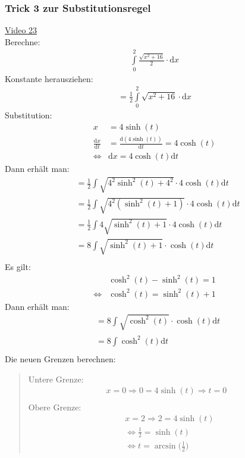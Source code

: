 \subsubsection{Trick 3 zur Substitutionsregel}
\href{https://youtu.be/wque3ru-qwM}{Video 23}\\
Berechne:\\
\begin{align*}
\int\limits_{0}^{2} \frac{\sqrt{x^2+16}}{2}\cdot \mathrm{d}x
\end{align*}
Konstante herausziehen:\\
\begin{align*}
=\frac{1}{2}\int\limits_{0}^{2} \sqrt{x^2+16}\cdot \mathrm{d}x
\end{align*}
Substitution:\\
\begin{align*}
x&=4\sinh(t)\\
\frac{\mathrm{d}x}{\mathrm{d}t}&=\frac{\mathrm{d}(4\sinh(t))}{\mathrm{d}t}=4\cosh(t)\\
\Leftrightarrow&\mathrm{d}x=4\cosh(t)\mathrm{d}t
\end{align*}
Dann erhält man:\\
\begin{align*}
&=\frac{1}{2}\int\limits_{}^{}\sqrt{4^2\sinh^2(t)+4^2}\cdot 4\cosh(t)\mathrm{d}t\\
&=\frac{1}{2}\int\limits_{}^{} \sqrt{4^2(\sinh^2(t)+1)}\cdot 4\cosh(t)\mathrm{d}t\\
&=\frac{1}{2}\int\limits_{}^{} 4\sqrt{\sinh^2(t)+1}\cdot 4\cosh(t)\mathrm{d}t\\
&=8\int\limits_{}^{} \sqrt{\sinh^2(t)+1}\cdot \cosh(t)\mathrm{d}t\\
\end{align*}
Es gilt:\\
\begin{align*}
&\cosh^2(t)-\sinh^2(t)=1\\
\Leftrightarrow & \cosh^2(t)=\sinh^2(t)+1
\end{align*}
Dann erhält man:\\
\begin{align*}
&=8\int\limits_{}^{} \sqrt{\cosh^2(t)}\cdot \cosh(t)\mathrm{d}t\\
&=8\int\limits_{}^{} \cosh^2(t)\mathrm{d}t
\end{align*}
Die neuen Grenzen berechnen:\\
\begin{quote}
	Untere Grenze:\\
	\begin{align*}
	x=0\Rightarrow 0=4\sinh(t) \Rightarrow t=0\\
	\end{align*}
	Obere Grenze:\\
	\begin{align*}
	&x=2\Rightarrow 2=4\sinh(t)\\
	&\Leftrightarrow \frac{1}{2}=\sinh(t)\\
	&\Leftrightarrow t=\arcsin\bigg(\frac{1}{2}\bigg)
	\end{align*}
\end{quote}
